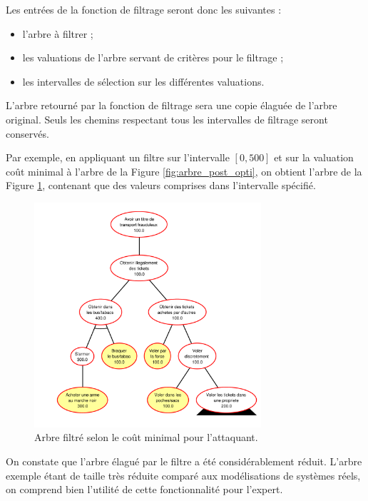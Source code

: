 		Les entrées de la fonction de filtrage seront donc les suivantes :
		\begin{itemize}
			\item l'arbre à filtrer ;
			\item les valuations de l'arbre servant de critères pour le filtrage ;
			\item les intervalles de sélection sur les différentes valuations.
		\end{itemize}
		L'arbre retourné par la fonction de filtrage sera une copie élaguée de l'arbre original. Seuls les chemins respectant tous les intervalles de filtrage seront conservés.

		Par exemple, en appliquant un filtre sur l'intervalle $[0, 500]$ et sur la valuation \og coût minimal \fg{} à l'arbre de la {\sc Figure} \ref{fig:arbre_post_opti}, on obtient l'arbre de la {\sc Figure} \ref{fig:arbre_post_filtre}, contenant que des valeurs comprises dans l'intervalle spécifié. 
		\begin{figure}[!h]
			\begin{center}
				\includegraphics[width=0.75\textwidth]{figure/post_filtre.pdf}
			\end{center}
			\caption{Arbre filtré selon le coût minimal pour l'attaquant.}
			\label{fig:arbre_post_filtre}
		\end{figure}
		On constate que l'arbre élagué par le filtre a été considérablement réduit. L'arbre exemple étant de taille très réduite comparé aux modélisations de systèmes réels, on comprend bien l'utilité de cette fonctionnalité pour l'expert.

